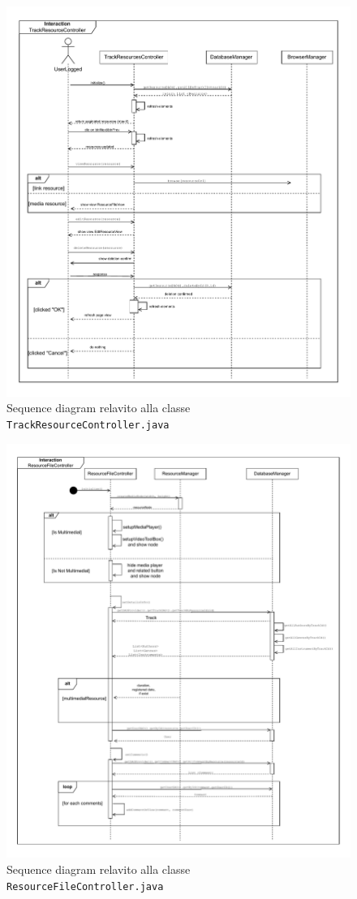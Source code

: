 \documentclass[a4paper]{article}
\begin{document}
\begin{figure}[H]
    \centering
    \includegraphics[width=0.8 \textwidth]{./figures/trackResourceController_sd}
    \caption{Sequence diagram relavito alla classe \texttt{TrackResourceController.java}}
    \label{fig:trackResourceController_sd}
\end{figure}

\begin{figure}[H]
    \centering
    \includegraphics[width=0.8 \textwidth]{./figures/fileViewController_sd}
    \caption{Sequence diagram relavito alla classe \texttt{ResourceFileController.java}}
    \label{fig:resourcefilecontroller_sd}
\end{figure}
\end{document}
